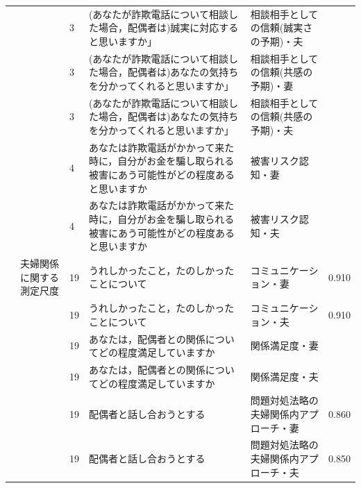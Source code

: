 \begin{landscape}
\begin{longtable}{p{2cm}p{2cm}p{2cm}p{6cm}p{2cm}p{2cm}}
		                         &                                  & 3   & (あなたが詐欺電話について相談した場合，配偶者は)誠実に対応すると思いますか」             & 相談相手としての信頼(誠実さの予期)・夫 &            \\
		                         &                                  & 3   & (あなたが詐欺電話について相談した場合，配偶者は)あなたの気持ちを分かってくれると思いますか」     & 相談相手としての信頼(共感の予期)・妻  &            \\
		                         &                                  & 3   & (あなたが詐欺電話について相談した場合，配偶者は)あなたの気持ちを分かってくれると思いますか」     & 相談相手としての信頼(共感の予期)・夫  &            \\
		                         &                                  & 4   & あなたは詐欺電話がかかって来た時に，自分がお金を騙し取られる被害にあう可能性がどの程度あると思いますか & 被害リスク認知・妻            &            \\
		                         &                                  & 4   & あなたは詐欺電話がかかって来た時に，自分がお金を騙し取られる被害にあう可能性がどの程度あると思いますか & 被害リスク認知・夫            &            \\
		                         & 夫婦関係に関する測定尺度                     & 19  & うれしかったこと，たのしかったことについて                               & コミュニケーション・妻          & 0.910      \\
		                         &                                  & 19  & うれしかったこと，たのしかったことについて                               & コミュニケーション・夫          & 0.910      \\
		                         &                                  & 19  & あなたは，配偶者との関係についてどの程度満足していますか                        & 関係満足度・妻              &            \\
		                         &                                  & 19  & あなたは，配偶者との関係についてどの程度満足していますか                        & 関係満足度・夫              &            \\
		                         &                                  & 19  & 配偶者と話し合おうとする                                        & 問題対処法略の夫婦関係内アプローチ・妻  & 0.860      \\
		                         &                                  & 19  & 配偶者と話し合おうとする                                        & 問題対処法略の夫婦関係内アプローチ・夫  & 0.850      \\

\end{longtable}
\end{landscape}
